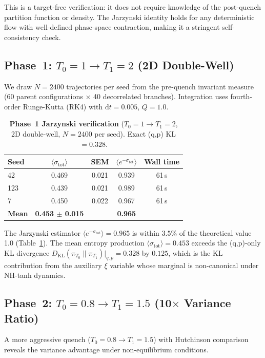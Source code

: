 \documentclass[11pt]{article}
\newcommand{\dd}{\mathrm{d}}
\newcommand{\stot}{\sigma_{\mathrm{tot}}}
\begin{document}
This is a target-free verification: it does not require knowledge of the
post-quench partition function or density. The Jarzynski identity holds for
any deterministic flow with well-defined phase-space contraction, making it a
stringent self-consistency check.

\subsection{Phase~1: $T_0 = 1 \to T_1 = 2$ (2D Double-Well)}

We draw $N = 2400$ trajectories per seed from the pre-quench invariant measure
(60 parent configurations $\times$ 40 decorrelated branches). Integration uses
fourth-order Runge-Kutta (RK4) with $\dd t = 0.005$, $Q = 1.0$.

\begin{table}[t]
  \centering
  \caption{\textbf{Phase~1 Jarzynski verification} ($T_0{=}1 \to T_1{=}2$,
    2D double-well, $N{=}2400$ per seed). Exact (q,p) KL $= 0.328$.}
  \label{tab:phase1}
  \small
  \begin{tabular}{lcccc}
    \toprule
    Seed & $\langle \stot \rangle$ & SEM & $\langle e^{-\stot} \rangle$ & Wall time \\
    \midrule
    42  & 0.469 & 0.021 & 0.939 & 61\,s \\
    123 & 0.439 & 0.021 & 0.989 & 61\,s \\
    7   & 0.450 & 0.022 & 0.967 & 61\,s \\
    \midrule
    \textbf{Mean} & \textbf{0.453 $\pm$ 0.015}
      & & \textbf{0.965} & \\
    \bottomrule
  \end{tabular}
\end{table}

The Jarzynski estimator $\langle e^{-\stot} \rangle = 0.965$ is within $3.5\%$
of the theoretical value 1.0 (Table~\ref{tab:phase1}). The mean entropy
production $\langle \stot \rangle = 0.453$ exceeds the (q,p)-only KL divergence
$D_{\mathrm{KL}}(\pi_{T_0} \| \pi_{T_1})\big|_{q,p} = 0.328$ by $0.125$,
which is the KL contribution from the auxiliary $\xi$ variable whose marginal
is non-canonical under NH-tanh dynamics.

\subsection{Phase~2: $T_0 = 0.8 \to T_1 = 1.5$ (10$\times$ Variance Ratio)}
\label{sec:phase2}

A more aggressive quench ($T_0{=}0.8 \to T_1{=}1.5$) with Hutchinson
comparison reveals the variance advantage under non-equilibrium conditions.
\end{document}
